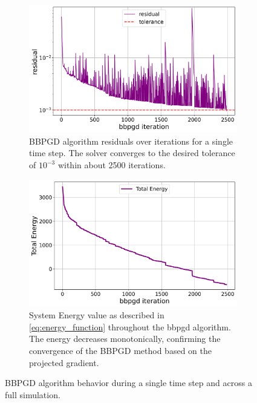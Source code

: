 \documentclass[conference]{IEEEtran}
\begin{document}
\begin{figure}[H]
    \centering
    \begin{subfigure}[b]{\linewidth}
        \centering
        \includegraphics[width=\linewidth]{figures/comparison_plots/bbpgd_residual.png}
        \caption{BBPGD algorithm residuals over iterations for a single time step. The solver converges to the desired tolerance of $10^{-3}$ within about 2500 iterations.}
        \label{fig:bbpgd_residual}
    \end{subfigure}


    \begin{subfigure}[b]{\linewidth}
        \centering
        \includegraphics[width=\linewidth]{figures/comparison_plots/bbpgd_total_energy.png}
        \caption{System Energy value as described in \autoref{eq:energy_function} throughout the bbpgd algorithm. The energy decreases monotonically, confirming the convergence of the BBPGD method based on the projected gradient.}
        \label{fig:bbpgd_energy}
    \end{subfigure}

    \caption{BBPGD algorithm behavior during a single time step and across a full simulation.}
\end{figure}
\end{document}
